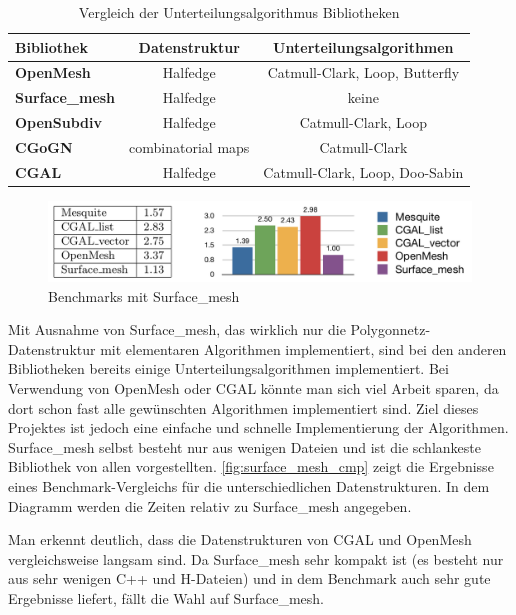 \begin{table}[hp]
\center
\caption{Vergleich der Unterteilungsalgorithmus Bibliotheken}
\begin{tabular}{l|c|c}
\textbf{Bibliothek} & \textbf{Datenstruktur} & \textbf{Unterteilungsalgorithmen}\\
\hline
\textbf{OpenMesh} & Halfedge & Catmull-Clark, Loop, Butterfly\\
\textbf{Surface\_mesh} & Halfedge & keine\\
\textbf{OpenSubdiv} & Halfedge & Catmull-Clark, Loop\\
\textbf{CGoGN} & combinatorial maps & Catmull-Clark\\
\textbf{CGAL} & Halfedge & Catmull-Clark, Loop, Doo-Sabin\\
\end{tabular}
\label{tab:sd_bib}
\end{table}

\begin{figure}[hp]
  \centering
  \includegraphics[width=1.0\textwidth]{content/media/surface_mesh_cmp}
   \caption{Benchmarks mit Surface\_mesh \cite{Sieger.}}
  \label{fig:surface_mesh_cmp}
\end{figure}

Mit Ausnahme von Surface\_mesh, das wirklich nur die Polygonnetz-Datenstruktur mit elementaren Algorithmen implementiert, sind bei den anderen Bibliotheken bereits
einige Unterteilungsalgorithmen implementiert.
Bei Verwendung von OpenMesh oder CGAL könnte man sich viel Arbeit sparen, da dort schon fast alle gewünschten Algorithmen implementiert sind.
Ziel dieses Projektes ist jedoch eine einfache und schnelle Implementierung der Algorithmen.
Surface\_mesh selbst besteht nur aus wenigen Dateien und ist die schlankeste Bibliothek von allen vorgestellten.
\autoref{fig:surface_mesh_cmp} zeigt die Ergebnisse eines Benchmark-Vergleichs für die unterschiedlichen Datenstrukturen.
In dem Diagramm werden die Zeiten relativ zu Surface\_mesh angegeben.



Man erkennt deutlich, dass die Datenstrukturen von CGAL und OpenMesh vergleichsweise langsam sind.
Da Surface\_mesh sehr kompakt ist (es besteht nur aus sehr wenigen C++ und H-Dateien) und in dem Benchmark auch sehr gute Ergebnisse liefert, fällt die Wahl auf Surface\_mesh.


